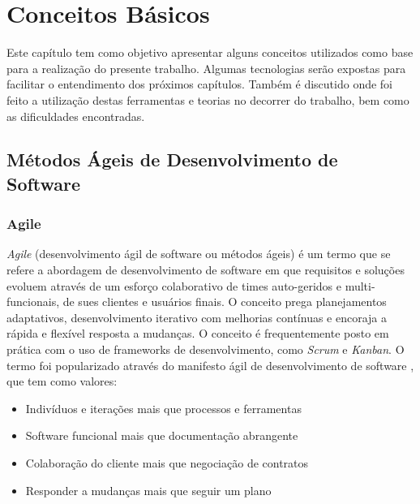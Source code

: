 \chapter{Conceitos Básicos}
Este capítulo tem como objetivo apresentar alguns conceitos utilizados como base para a realização do presente trabalho. Algumas tecnologias serão expostas para facilitar o entendimento dos próximos capítulos. Também é discutido onde foi feito a utilização destas ferramentas e teorias no decorrer do trabalho, bem como as dificuldades encontradas.
\section{Métodos Ágeis de Desenvolvimento de Software}

\subsection{Agile}
\textit{Agile} (desenvolvimento ágil de software ou métodos ágeis) é um termo que se refere a abordagem de desenvolvimento de software em que requisitos e soluções evoluem através de um esforço colaborativo de times auto-geridos e multi-funcionais, de sues clientes e usuários finais. O conceito prega planejamentos adaptativos, desenvolvimento iterativo com melhorias contínuas e encoraja a rápida e flexível resposta a mudanças. O conceito é frequentemente posto em prática com o uso de frameworks de desenvolvimento, como \textit{Scrum} e \textit{Kanban}. O termo foi popularizado através do manifesto ágil de desenvolvimento de software , que tem como valores:

\begin{itemize}
    \item Indivíduos e iterações mais que processos e ferramentas
    \item Software funcional mais que documentação abrangente
    \item Colaboração do cliente mais que negociação de contratos
    \item Responder a mudanças mais que seguir um plano
\end{itemize}


